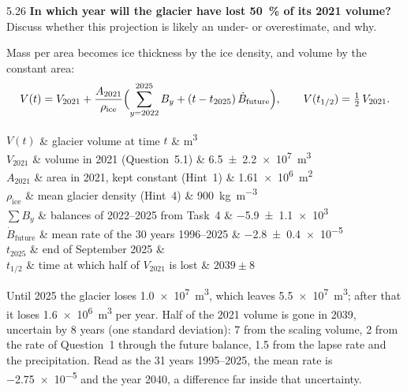 \documentclass{scrartcl}
\renewcommand\unv[1]{#1}%
\begin{document}
\begin{reportpart}
\begin{question}{5.2}{6}
\textbf{In which year will the glacier have lost \qty{50}{\percent} of its 2021 volume?} Discuss
whether this projection is likely an under- or overestimate, and why.
\end{question}

\unv{Mass per area becomes ice thickness by the ice density, and volume by the constant area:
\[
  V(t) = V_{2021} + \frac{A_{2021}}{\rho_\text{ice}}
    \Bigl(\sum_{y=2022}^{2025} B_y + (t - t_{2025})\,\dot B_\text{future}\Bigr) ,
  \qquad
  V(t_{1/2}) = \tfrac12\,V_{2021} .
\]
\begin{symbols}
  $V(t)$ & glacier volume at time $t$ & \unit{\cubic\metre} \\
  $V_{2021}$ & volume in 2021 (Question~5.1) & \qty{6.5 \pm 2.2 e7}{\cubic\metre} \\
  $A_{2021}$ & area in 2021, kept constant (Hint~1) & \qty{1.61e6}{\square\metre} \\
  $\rho_\text{ice}$ & mean glacier density (Hint~4) & \qty{900}{\kilo\gram\per\cubic\metre} \\
  $\sum B_y$ & balances of 2022--2025 from Task~4 & \qty{-5.9 \pm 1.1 e3}{\areal} \\
  $\dot B_\text{future}$ & mean rate of the 30 years 1996--2025 & \qty{-2.8 \pm 0.4 e-5}{\massflux} \\
  $t_{2025}$ & end of September 2025 & \\
  $t_{1/2}$ & time at which half of $V_{2021}$ is lost & $2039 \pm 8$ \\
\end{symbols}
Until 2025 the glacier loses \qty{1.0e7}{\cubic\metre}, which leaves
\qty{5.5e7}{\cubic\metre}; after that it loses \qty{1.6e6}{\cubic\metre} per year. Half of the
2021 volume is gone in 2039, uncertain by 8 years (one standard deviation): 7 from the
scaling volume, 2 from the rate of Question~1 through the future balance, 1.5 from the lapse
rate and the precipitation. Read as the 31 years 1995--2025, the mean rate is
\qty{-2.75e-5}{\massflux} and the year 2040, a difference far inside that uncertainty.

}
\end{reportpart}
\end{document}

